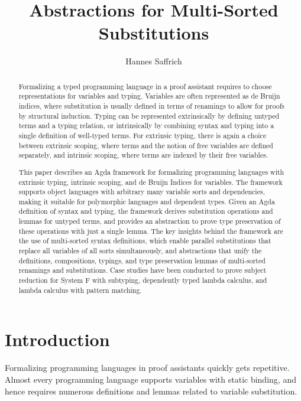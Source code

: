 \documentclass[a4paper, UKenglish, cleveref, autoref, thm-restate]{lipics-v2021}
\title{Abstractions for Multi-Sorted Substitutions}
\author{Hannes Saffrich}{University of Freiburg, Germany}{saffrich@informatik.uni-freiburg.de}{https://orcid.org/0009-0004-7014-754X}{}
\begin{document}
  \maketitle

  \begin{abstract}
    Formalizing a typed programming language in a proof assistant
    requires to choose representations for variables and typing.
    Variables are often represented as de Bruijn indices, where
    substitution is usually defined in terms of renamings to allow for
    proofs by structural induction.
    Typing can be represented extrinsically by defining untyped terms and a typing
    relation, or intrinsically by combining syntax and typing into a single
    definition of well-typed terms.
    For extrinsic typing, there is again a choice between extrinsic
    scoping, where terms and the notion of free variables are defined
    separately, and intrinsic scoping, where terms are indexed by their
    free variables.

    This paper describes an Agda framework for formalizing programming
    languages with extrinsic typing, intrinsic scoping, and de Bruijn
    Indices for variables.
    The framework supports object languages with arbitrary many
    variable sorts and dependencies, making it suitable for
    polymorphic languages and dependent types.
    Given an Agda definition of syntax and typing, the framework derives
    substitution operations and lemmas for untyped terms, and provides an
    abstraction to prove type preservation of these operations with
    just a single lemma.
    The key insights behind the framework are the use of multi-sorted syntax
    definitions, which enable parallel substitutions that replace
    all variables of all sorts simultaneously, and
    abstractions that unify the definitions, compositions, typings,
    and type preservation lemmas of multi-sorted renamings and substitutions.
    Case studies have been conducted to prove subject reduction for
    System F with subtyping, dependently typed lambda calculus, and lambda
    calculus with pattern matching.
  \end{abstract}

  \section{Introduction}
  \label{sec:introduction}

  Formalizing programming languages in proof assistants quickly gets
  repetitive. Almost every programming language supports variables
  with static binding, and hence requires numerous definitions and
  lemmas related to variable substitution.
\end{document}
